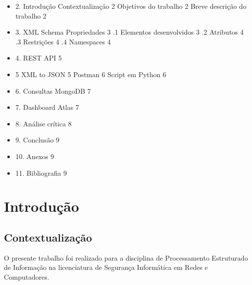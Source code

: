 \documentclass{article}
\begin{document}
\begin{itemize}
    \item 2. Introdução
         Contextualização \hspace*{\fill} 2
         Objetivos do trabalho \hspace*{\fill} 2
         Breve descrição do trabalho \hspace*{\fill} 2
    \item 3. XML Schema
         Propriedades   \hspace*{\fill} 3
            .1 Elementos desenvolvidos   \hspace*{\fill} 3
            .2 Atributos   \hspace*{\fill} 4
            .3 Restrições   \hspace*{\fill} 4
            .4 Namespaces   \hspace*{\fill} 4
    \item 4. REST API \hspace*{\fill} 5
    \item 5 XML to JSON \hspace*{\fill} 5
         Postman   \hspace*{\fill} 6
         Script em Python   \hspace*{\fill} 6
    \item 6. Consultas MongoDB \hspace*{\fill} 7 
    \item 7. Dashboard Atlas \hspace*{\fill} 7
    \item 8. Análise crítica \hspace*{\fill} 8
    \item 9. Conclusão \hspace*{\fill} 9
    \item 10. Anexos \hspace*{\fill} 9
    \item 11. Bibliografia\hspace*{\fill} 9
\end{itemize} 

\newpage
\section{Introdução}
\subsection{Contextualização}
\hspace{0.5cm}O presente trabalho foi realizado para a disciplina de Processamento Estruturado de Informação na licenciatura de Segurança Informática em Redes e Computadores. \par
\end{document}
